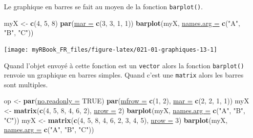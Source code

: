 \documentclass[twoside,symmetric]{book}
\newenvironment{Shaded}{}{}
\newcommand{\DataTypeTok}[1]{\underline{#1}}
\newcommand{\DecValTok}[1]{#1}
\newcommand{\KeywordTok}[1]{\textbf{#1}}
\newcommand{\NormalTok}[1]{#1}
\newcommand{\OtherTok}[1]{#1}
\newcommand{\StringTok}[1]{#1}
\begin{document}
Le graphique en barres se fait au moyen de la fonction \texttt{barplot()}.

\begin{Shaded}
\begin{Highlighting}[]
\NormalTok{myX <-}\StringTok{ }\KeywordTok{c}\NormalTok{(}\DecValTok{4}\NormalTok{, }\DecValTok{5}\NormalTok{, }\DecValTok{8}\NormalTok{)}
\KeywordTok{par}\NormalTok{(}\DataTypeTok{mar =} \KeywordTok{c}\NormalTok{(}\DecValTok{3}\NormalTok{, }\DecValTok{3}\NormalTok{, }\DecValTok{1}\NormalTok{, }\DecValTok{1}\NormalTok{)) }
\KeywordTok{barplot}\NormalTok{(myX, }\DataTypeTok{names.arg =} \KeywordTok{c}\NormalTok{(}\StringTok{"A"}\NormalTok{, }\StringTok{"B"}\NormalTok{, }\StringTok{"C"}\NormalTok{))}
\end{Highlighting}
\end{Shaded}

\texttt{[image: myRBook\_FR\_files/figure-latex/021-01-graphiques-13-1]}

Quand l'objet envoyé à cette fonction est un \texttt{vector} alors la fonction \texttt{barplot()} renvoie un graphique en barres simples. Quand c'est une \texttt{matrix} alors les barres sont multiples.

\begin{Shaded}
\begin{Highlighting}[]
\NormalTok{op <-}\StringTok{ }\KeywordTok{par}\NormalTok{(}\DataTypeTok{no.readonly =} \OtherTok{TRUE}\NormalTok{)}
\KeywordTok{par}\NormalTok{(}\DataTypeTok{mfrow =} \KeywordTok{c}\NormalTok{(}\DecValTok{1}\NormalTok{, }\DecValTok{2}\NormalTok{), }\DataTypeTok{mar =} \KeywordTok{c}\NormalTok{(}\DecValTok{2}\NormalTok{, }\DecValTok{2}\NormalTok{, }\DecValTok{1}\NormalTok{, }\DecValTok{1}\NormalTok{))}
\NormalTok{myX <-}\StringTok{ }\KeywordTok{matrix}\NormalTok{(}\KeywordTok{c}\NormalTok{(}\DecValTok{4}\NormalTok{, }\DecValTok{5}\NormalTok{, }\DecValTok{8}\NormalTok{, }\DecValTok{4}\NormalTok{, }\DecValTok{6}\NormalTok{, }\DecValTok{2}\NormalTok{), }\DataTypeTok{nrow =} \DecValTok{2}\NormalTok{)}
\KeywordTok{barplot}\NormalTok{(myX, }\DataTypeTok{names.arg =} \KeywordTok{c}\NormalTok{(}\StringTok{"A"}\NormalTok{, }\StringTok{"B"}\NormalTok{, }\StringTok{"C"}\NormalTok{))}
\NormalTok{myX <-}\StringTok{ }\KeywordTok{matrix}\NormalTok{(}\KeywordTok{c}\NormalTok{(}\DecValTok{4}\NormalTok{, }\DecValTok{5}\NormalTok{, }\DecValTok{8}\NormalTok{, }\DecValTok{4}\NormalTok{, }\DecValTok{6}\NormalTok{, }\DecValTok{2}\NormalTok{, }\DecValTok{3}\NormalTok{, }\DecValTok{4}\NormalTok{, }\DecValTok{5}\NormalTok{), }\DataTypeTok{nrow =} \DecValTok{3}\NormalTok{)}
\KeywordTok{barplot}\NormalTok{(myX, }\DataTypeTok{names.arg =} \KeywordTok{c}\NormalTok{(}\StringTok{"A"}\NormalTok{, }\StringTok{"B"}\NormalTok{, }\StringTok{"C"}\NormalTok{))}
\end{Highlighting}
\end{Shaded}
\end{document}
